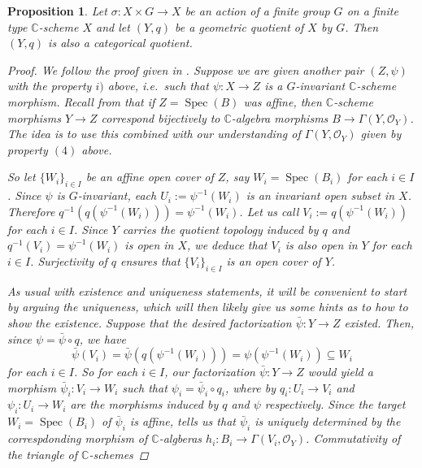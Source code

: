 \documentclass[12pt,a4paper]{amsart}
\theoremstyle{plain}
\newtheorem{prop}[thm]{Proposition}
\theoremstyle{definition}
\theoremstyle{remark}
\begin{document}
\begin{prop}
  Let $\sigma \colon X \times G \to X$ be an action of a finite group $G$ on a finite type $\mathbb{C}$-scheme $X$ and let $(Y, q)$ be a geometric quotient of $X$ by $G$.
  Then $(Y, q)$ is also a categorical quotient.

  \begin{proof}
    We follow the proof given in \cite[Proposition 0.1]{mfk94}.
    Suppose we are given another pair $(Z, \psi)$ with the property $i)$ above, i.e.~such that $\psi \colon X \to Z$ is a $G$-invariant $\mathbb{C}$-scheme morphism.
    Recall from \cite[Exercise II.2.4]{har77} that if $Z = \operatorname{Spec}(B)$ was affine, then $\mathbb{C}$-scheme morphisms $Y \to Z$ correspond bijectively to $\mathbb{C}$-algebra morphisms $B \to \Gamma(Y,\mathscr{O}_{Y})$.
    The idea is to use this combined with our understanding of $\Gamma(Y,\mathscr{O}_{Y})$ given by property $(4)$ above.

    So let $\{ W_{i} \}_{i \in I}$ be an affine open cover of $Z$, say $W_{i} = \operatorname{Spec}(B_{i})$ for each $i \in I$.
    Since $\psi$ is $G$-invariant, each $U_{i} := \psi^{-1}(W_{i})$ is an invariant open subset in $X$.
    Therefore $q^{-1}(q(\psi^{-1}(W_{i}))) = \psi^{-1}(W_{i})$.
    Let us call $V_{i} := q(\psi^{-1}(W_{i}))$ for each $i \in I$.
    Since $Y$ carries the quotient topology induced by $q$ and $q^{-1}(V_{i}) = \psi^{-1}(W_{i})$ is open in $X$, we deduce that $V_{i}$ is also open in $Y$ for each $i \in I$.
    Surjectivity of $q$ ensures that $\{ V_{i} \}_{i \in I}$ is an open cover of $Y$.

    As usual with existence and uniqueness statements, it will be convenient to start by arguing the uniqueness, which will then likely give us some hints as to how to show the existence.
    Suppose that the desired factorization $\bar{\psi} \colon Y \to Z$ existed.
    Then, since $\psi = \bar{\psi} \circ q$, we have
    \[ \bar{\psi}(V_{i}) = \bar{\psi}(q(\psi^{-1}(W_{i}))) = \psi(\psi^{-1}(W_{i})) \subseteq W_{i} \]
    for each $i \in I$.
    So for each $i \in I$, our factorization $\bar{\psi} \colon Y \to Z$ would yield a morphism $\bar{\psi}_{i} \colon V_{i} \to W_{i}$ such that $\psi_{i} = \bar{\psi}_{i} \circ q_{i}$, where by $q_{i} \colon U_{i} \to V_{i}$ and $\psi_{i} \colon U_{i} \to W_{i}$ are the morphisms induced by $q$ and $\psi$ respectively.
    Since the target $W_{i} = \operatorname{Spec}(B_{i})$ of $\bar{\psi}_{i}$ is affine, \cite[Exercise II.2.4]{har77} tells us that $\bar{\psi}_{i}$ is uniquely determined by the correspdonding morphism of $\mathbb{C}$-algberas $h_{i} \colon B_{i} \to \Gamma(V_{i}, \mathscr{O}_{Y})$.
    Commutativity of the triangle of $\mathbb{C}$-schemes
    

\end{proof}
\end{prop}
\end{document}

